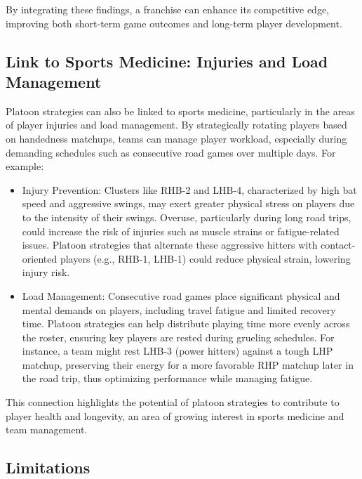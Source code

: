 \documentclass[
]{article}
\providecommand{\tightlist}{%
  \setlength{\itemsep}{0pt}\setlength{\parskip}{0pt}}
\begin{document}
By integrating these findings, a franchise can enhance its competitive
edge, improving both short-term game outcomes and long-term player
development.

\hypertarget{link-to-sports-medicine-injuries-and-load-management}{%
\subsection{Link to Sports Medicine: Injuries and Load
Management}\label{link-to-sports-medicine-injuries-and-load-management}}

Platoon strategies can also be linked to sports medicine, particularly
in the areas of player injuries and load management. By strategically
rotating players based on handedness matchups, teams can manage player
workload, especially during demanding schedules such as consecutive road
games over multiple days. For example:

\begin{itemize}
\tightlist
\item
  Injury Prevention: Clusters like RHB-2 and LHB-4, characterized by
  high bat speed and aggressive swings, may exert greater physical
  stress on players due to the intensity of their swings. Overuse,
  particularly during long road trips, could increase the risk of
  injuries such as muscle strains or fatigue-related issues. Platoon
  strategies that alternate these aggressive hitters with
  contact-oriented players (e.g., RHB-1, LHB-1) could reduce physical
  strain, lowering injury risk.
\item
  Load Management: Consecutive road games place significant physical and
  mental demands on players, including travel fatigue and limited
  recovery time. Platoon strategies can help distribute playing time
  more evenly across the roster, ensuring key players are rested during
  grueling schedules. For instance, a team might rest LHB-3 (power
  hitters) against a tough LHP matchup, preserving their energy for a
  more favorable RHP matchup later in the road trip, thus optimizing
  performance while managing fatigue.
\end{itemize}

This connection highlights the potential of platoon strategies to
contribute to player health and longevity, an area of growing interest
in sports medicine and team management.

\hypertarget{limitations}{%
\subsection{Limitations}\label{limitations}}
\end{document}
